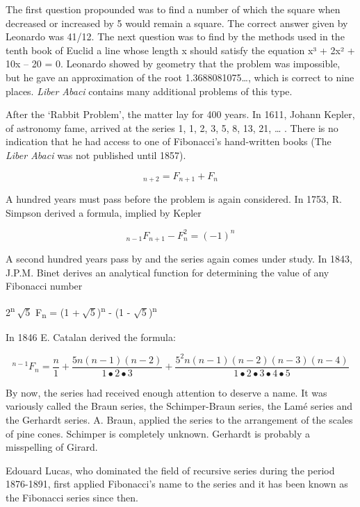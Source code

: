 \documentclass[10pt,letter]{article}
\begin{document}
The first question propounded was to find a number of which the square
when decreased or increased by 5 would remain a square. The correct
answer given by Leonardo was 41/12. The next question was to find by the
methods used in the tenth book of Euclid a line whose length x should
satisfy the equation x³ + 2x² + 10x -- 20 = 0. Leonardo showed by
geometry that the problem was impossible, but he gave an approximation
of the root 1.3688081075\ldots{}, which is correct to nine places.
\emph{Liber Abaci} contains many additional problems of this type.

After the `Rabbit Problem', the matter lay for 400 years. In 1611,
Johann Kepler, of astronomy fame, arrived at the series 1, 1, 2, 3, 5,
8, 13, 21, \ldots{} . There is no indication that he had access to one
of Fibonacci's hand-written books (The \emph{Liber Abaci} was not
published until 1857).

\[
_{n + 2} = F_{n + 1} + F_{n}
\]

A hundred years must pass before the problem is again considered. In
1753, R. Simpson derived a formula, implied by Kepler

\[
_{n - 1}F_{n + 1} - F_{n}^{2} = \left( - 1 \right)^{n}
\]

A second hundred years pass by and the series again comes under study.
In 1843, J.P.M. Binet derives an analytical function for determining the
value of any Fibonacci number

2\textsuperscript{n}\(\ \sqrt{5}\) F\textsubscript{n} = (1
+\(\ \sqrt{5}\))\textsuperscript{n} - (1 -
\(\sqrt{5}\))\textsuperscript{n}

In 1846 E. Catalan derived the formula:

\[
^{n - 1}F_{n} = \frac{n}{1} + \frac{5n\left( n - 1 \right)\left( n - 2 \right)}{1 \bullet 2 \bullet 3} + \frac{5^{2}n\left( n - 1 \right)\left( n - 2 \right)\left( n - 3 \right)\left( n - 4 \right)}{1 \bullet 2 \bullet 3 \bullet 4 \bullet 5}
\]

By now, the series had received enough attention to deserve a name. It
was variously called the Braun series, the Schimper-Braun series, the
Lamé series and the Gerhardt series. A. Braun, applied the series to the
arrangement of the scales of pine cones. Schimper is completely unknown.
Gerhardt is probably a misspelling of Girard.

Edouard Lucas, who dominated the field of recursive series during the
period 1876-1891, first applied Fibonacci's name to the series and it
has been known as the Fibonacci series since then.
\end{document}
